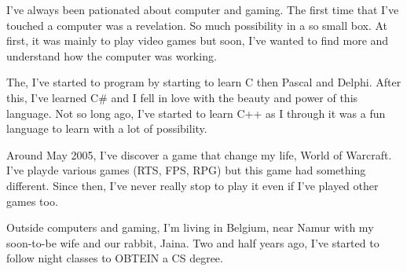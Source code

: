 
I've always been pationated about computer and gaming. The first time that I've touched a computer was a revelation. So much possibility in a so small box. At first, it was mainly to play video games but soon, I've wanted to find more and understand how the computer was working.

The, I've started to program by starting to learn C then Pascal and Delphi. After this, I've learned C\# and I fell in love with the beauty and power of this language. Not so long ago, I've started to learn C++ as I through it was a fun language to learn with a lot of possibility. 

Around May 2005, I've discover a game that change my life, World of Warcraft. I've playde various games (RTS, FPS, RPG) but this game had something different. Since then, I've never really stop to play it even if I've played other games too. 

Outside computers and gaming, I'm living in Belgium, near Namur with my soon-to-be wife and our rabbit, Jaina. Two and half years ago, I've started to follow night classes to OBTEIN a CS degree. 